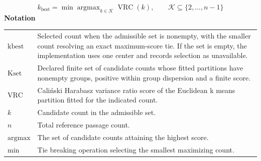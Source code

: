 \documentclass[10pt,letterpaper]{article}
\newcommand{\notlabel}{\noindent\textbf{Notation}\par\nobreak\vspace{4pt}}
\begin{document}
\par\noindent\begin{minipage}{\linewidth}
\begin{equation}\label{eq:kbest}
k_{\mathrm{best}}=\min\mathop{\arg\max}_{k\in\mathcal K}\operatorname{VRC}(k),\qquad\mathcal K\subseteq\{2,\ldots,n-1\}
\end{equation}
\notlabel
{\fontsize{8.5}{10.5}\selectfont\setlength{\tabcolsep}{0pt}\renewcommand{\arraystretch}{1.12}
\begin{tabularx}{\linewidth}{@{}p{.14\linewidth}X@{}}
$\mathrm{kbest}$ & Selected count when the admissible set is nonempty, with the smaller count resolving an exact maximum-score tie. If the set is empty, the implementation uses one center and records selection as unavailable.\\
$\mathrm{Kset}$ & Declared finite set of candidate counts whose fitted partitions have nonempty groups, positive within group dispersion and a finite score.\\
$\mathrm{VRC}$ & Caliński Harabasz variance ratio score of the Euclidean k means partition fitted for the indicated count.\\
$k$ & Candidate count in the admissible set.\\
$n$ & Total reference passage count.\\
$\mathrm{argmax}$ & The set of candidate counts attaining the highest score.\\
$\mathrm{min}$ & Tie breaking operation selecting the smallest maximizing count.\\
\end{tabularx}}
\par\vspace{2pt}
\end{minipage}\par
\end{document}
